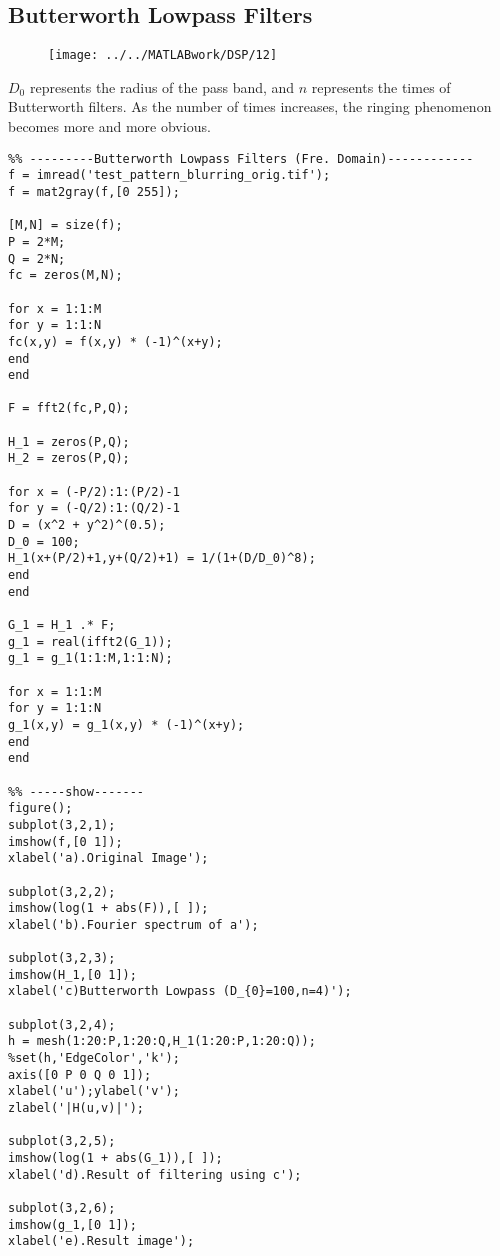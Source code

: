 \documentclass[12pt,a4paper]{article}
\begin{document}
\subsection{Butterworth Lowpass Filters}
\begin{figure}[ht]
	\begin{center}
		\texttt{[image: ../../MATLABwork/DSP/12]}
	\end{center}
\end{figure}
$D_0$ represents the radius of the pass band, and $n$ represents the times of Butterworth filters. As the number of times increases, the ringing phenomenon becomes more and more obvious.
\lstset{language=Matlab}
\begin{lstlisting}
%% ---------Butterworth Lowpass Filters (Fre. Domain)------------
f = imread('test_pattern_blurring_orig.tif');
f = mat2gray(f,[0 255]);

[M,N] = size(f);
P = 2*M;
Q = 2*N;
fc = zeros(M,N);

for x = 1:1:M
for y = 1:1:N
fc(x,y) = f(x,y) * (-1)^(x+y);
end
end

F = fft2(fc,P,Q);

H_1 = zeros(P,Q);
H_2 = zeros(P,Q);

for x = (-P/2):1:(P/2)-1
for y = (-Q/2):1:(Q/2)-1
D = (x^2 + y^2)^(0.5);
D_0 = 100;
H_1(x+(P/2)+1,y+(Q/2)+1) = 1/(1+(D/D_0)^8);   
end
end

G_1 = H_1 .* F;
g_1 = real(ifft2(G_1));
g_1 = g_1(1:1:M,1:1:N);

for x = 1:1:M
for y = 1:1:N
g_1(x,y) = g_1(x,y) * (-1)^(x+y);
end
end

%% -----show-------
figure();
subplot(3,2,1);
imshow(f,[0 1]);
xlabel('a).Original Image');

subplot(3,2,2);
imshow(log(1 + abs(F)),[ ]);
xlabel('b).Fourier spectrum of a');

subplot(3,2,3);
imshow(H_1,[0 1]);
xlabel('c)Butterworth Lowpass (D_{0}=100,n=4)');

subplot(3,2,4);
h = mesh(1:20:P,1:20:Q,H_1(1:20:P,1:20:Q));
%set(h,'EdgeColor','k');
axis([0 P 0 Q 0 1]);
xlabel('u');ylabel('v');
zlabel('|H(u,v)|');

subplot(3,2,5);
imshow(log(1 + abs(G_1)),[ ]);
xlabel('d).Result of filtering using c');

subplot(3,2,6);
imshow(g_1,[0 1]);
xlabel('e).Result image');
\end{lstlisting}
\end{document}
